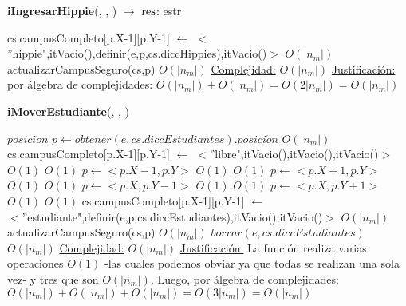 \begin{Algoritmos}
\begin{algorithm}[H]{\textbf{iIngresarHippie}(, , ) $\to$ $\res$: estr}
	\begin{algorithmic}
    	\State cs.campusCompleto[p.X-1][p.Y-1] $\gets$ $<$''hippie",itVacio(),definir(e,p,cs.diccHippies),itVacio()$>$	\Comment $O(|n_{m}|)$
		\State actualizarCampusSeguro(cs,p)	\Comment $O(|n_{m}|)$
        \medskip
		\Statex \underline{Complejidad:} $O(|n_{m}|)$
        \Statex \underline{Justificaci\'on:} por \'algebra de complejidades: $O(|n_{m}|) + O(|n_{m}|) = O(2|n_{m}|) = O(|n_{m}|)$
	\end{algorithmic}
\end{algorithm}

\begin{algorithm}[H]{\textbf{iMoverEstudiante}(, , )}
	\begin{algorithmic}
   \State $posici\acute{o}n$ $p \gets obtener(e,cs.diccEstudiantes).posici\acute{o}n$	 		\Comment $O(|n_{m}|)$
  	\State cs.campusCompleto[p.X-1][p.Y-1] $\gets$ $<$''libre",itVacio(),itVacio(),itVacio()$>$	\Comment $O(1)$
       	\Comment $O(1)$
       \State $p \gets <p.X-1,p.Y>$	\Comment $O(1)$
        \EndIf
        	\Comment $O(1)$
        	\State $p \gets <p.X+1,p.Y>$	\Comment $O(1)$
        \EndIf
        	\Comment $O(1)$
        	\State $p \gets <p.X,p.Y-1>$	\Comment $O(1)$
        \EndIf
        	\Comment $O(1)$
        	\State $p \gets <p.X,p.Y+1>$	\Comment $O(1)$
        \EndIf
        	\Comment $O(1)$
    		\State cs.campusCompleto[p.X-1][p.Y-1] $\gets$ \\ $<$''estudiante",definir(e,p,cs.diccEstudiantes),itVacio(),itVacio()$>$	\Comment $O(|n_{m}|)$
        	\State actualizarCampusSeguro(cs,p)	\Comment $O(|n_{m}|)$
        \Else
        	\State $borrar(e,cs.diccEstudiantes)$	\Comment $O(|n_{m}|)$
        \EndIf
        \medskip
		\Statex \underline{Complejidad:} $O(|n_{m}|)$
        \Statex \underline{Justificaci\'on:} La funci\'on realiza varias operaciones $O(1)$ -las cuales podemos obviar ya que todas se realizan una sola vez- y tres que son $O(|n_{m}|)$. Luego, por \'algebra de complejidades: $O(|n_{m}|) + O(|n_{m}|) + O(|n_{m}|) = O(3|n_{m}|) = O(|n_{m}|)$
	\end{algorithmic}
\end{algorithm}


\end{Algoritmos}
